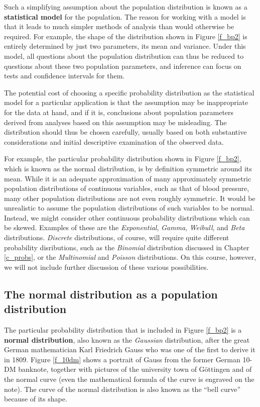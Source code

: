 \label{p_model}
Such a simplifying assumption about
the population distribution is known as a \textbf{statistical model} for
the population.
The reason for working with a model is that it leads to much
simpler methods of analysis than would otherwise be required. For
example, the shape of the distribution shown in Figure \ref{f_bp2} is
entirely determined by just two parameters, its mean and variance.
Under this model, all questions about the population distribution
can thus be reduced to questions about these two
population parameters, and inference can focus on tests and confidence
intervals for them.

The potential cost of choosing a specific probability distribution as
the statistical model for a particular application is that the
assumption may be inappropriate for the data at hand, and if it is,
conclusions about population parameters derived from analyses based on
this assumption may be misleading. The distribution should thus be
chosen carefully, usually based on both substantive considerations and
initial descriptive examination of the observed data.

For example, the particular probability distribution shown in Figure
\ref{f_bp2}, which is known as the normal distribution, is by definition
symmetric around its mean. While it is an adequate approximation of many
approximately symmetric population distributions of continuous
variables, such as that of blood pressure, many other population
distributions are not even roughly symmetric. It would be unrealistic to
assume the population distributions of such variables to be normal.
Instead, we might consider other continuous probability distributions
which can be skewed. Examples of these are the \emph{Exponential},
\emph{Gamma}, \emph{Weibull}, and \emph{Beta} distributions.
\emph{Discrete} distributions, of course, will require quite different
probability disributions, such as the \emph{Binomial} distribution
discussed in Chapter \ref{c_probs}, or the \emph{Multinomial} and
\emph{Poisson} distributions. On this course, however, we will not
include further discussion of these various possibilities.

\subsection{The normal distribution as a population distribution}
\label{ss_contd_probdistrs_normal}

The particular probability distribution that is included in Figure
\ref{f_bp2} is a \textbf{normal distribution}, also known as the
\emph{Gaussian} distribution, after the great German mathematician Karl
Friedrich Gauss who was one of the first to derive it in 1809. Figure
\ref{f_10dm} shows a portrait of Gauss from the former German 10-DM
banknote, together with pictures of the university town of G\"{o}ttingen
and of the normal curve (even the mathematical formula of the curve is
engraved on the note). The curve of the normal distribution is also
known as the ``bell curve'' because of its shape.


